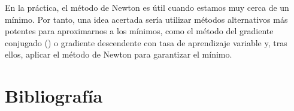 En la práctica, el método de Newton es útil cuando estamos muy cerca de un mínimo. Por tanto, una idea acertada sería utilizar métodos alternativos más potentes para aproximarnos a los mínimos, como el método del gradiente conjugado (\cite{pam}) o gradiente descendente con tasa de aprendizaje variable y, tras ellos, aplicar el método de Newton para garantizar el mínimo.
\newpage
\section{Bibliografía}




